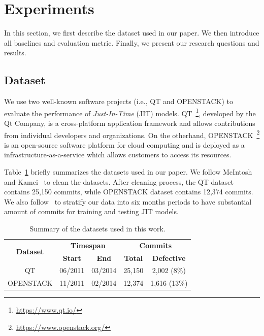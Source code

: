\section{Experiments}
\label{sec:exp}
In this section, we first describe the dataset used in our paper. We then introduce all baselines and evaluation metric. Finally, we present our research questions and results.

\subsection{Dataset}
\label{sec:dataset}
We use two well-known software projects (i.e., QT and OPENSTACK) to evaluate the performance of \emph{Just-In-Time} (JIT) models. QT~\footnote{\url{https://www.qt.io/}}, developed by the Qt Company, is a cross-platform application framework and allows contributions from individual developers and organizations. On the otherhand, OPENSTACK~\footnote{\url{https://www.openstack.org/}} is an open-source software platform for cloud computing and is deployed as a infrastructure-as-a-service which allows customers to access its resources. 

Table~\ref{tab:data} briefly summarizes the datasets used in our paper. We follow McIntosh and Kamei~\cite{mcintosh2018fix} to clean the datasets. After cleaning process, the QT dataset contains 25,150 commits, while OPENSTACK dataset contains 12,374 commits. We also follow~\cite{mcintosh2018fix} to stratify our data into six months periods to have substantial amount of commits for training and testing JIT models. 

\begin{table}[t!]
  \centering
  \caption{Summary of the datasets used in this work.}
    \begin{tabular}{|c|c|c|c|c|}
    \hline
    \multirow{2}[4]{*}{\textbf{Dataset}} & \multicolumn{2}{c|}{\textbf{Timespan}} & \multicolumn{2}{c|}{\textbf{Commits}} \\
\cline{2-5}          & \textbf{Start} & \textbf{End} & \textbf{Total} & \textbf{Defective} \\
    \hline
    \hline
    QT    & 06/2011 &  03/2014 & 25,150 & 2,002 (8\%) \\
    \hline
    OPENSTACK & 11/2011 &  02/2014 & 12,374 & 1,616 (13\%) \\
    \hline
    \end{tabular}%
  \label{tab:data}%
\end{table}%

